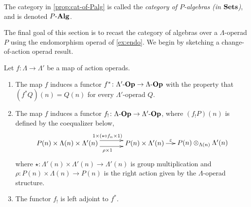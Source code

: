\begin{nota}\label{nota:cat-of-palg}
The category in \cref{prop:cat-of-Palg} is called the \emph{category of $P$-algebras (in $\mathbf{Sets}$)}, and is denoted $P\mbox{-}\mathbf{Alg}$.
\end{nota}

The final goal of this section is to recast the category of algebras over a $\Lambda$-operad $P$ using the endomorphism operad of \cref{ex:endo}.
We begin by sketching a change-of-action operad result.

\begin{prop}\label{prop:pbaop}
Let $f \colon \Lambda \rightarrow \Lambda'$ be a map of action operads. 
\begin{enumerate}
\item The map $f$ induces a functor $f^{*} \colon \Lambda'\mbox{-}\mathbf{Op} \rightarrow \Lambda\mbox{-}\mathbf{Op}$ with the property that $(f^{*}Q)(n) = Q(n)$ for every $\Lambda'$-operad $Q$.
\item The map $f$ induces a functor $f_{!} \colon \Lambda\mbox{-}\mathbf{Op} \rightarrow \Lambda'\mbox{-}\mathbf{Op}$, where $(f_{!}P)(n)$ is defined by the coequalizer below,
    \[
        \xy
            (-10,0)*+{P(n) \times \Lambda(n) \times \Lambda'(n)}="00";
            (30,0)*+{P(n) \times \Lambda'(n)}="10";
            (60,0)*+{\coeqb{P(n)}{\Lambda'(n)}{\Lambda(n)}}="20";
            {\ar@<1ex>^(.52){1 \times (\star \circ f_n \times 1)} "00" ; "10"};
            {\ar@<-1ex>_(.52){\rho \times 1} "00" ; "10"};
            {\ar^(.45){\varepsilon} "10" ; "20"};
        \endxy
    \]
where $\star \colon \Lambda'(n) \times \Lambda'(n) \to \Lambda'(n)$ is group multiplication and $\rho \colon P(n) \times \Lambda(n) \to P(n)$ is the right action given by the $\Lambda$-operad structure. 
\item The functor $f_{!}$ is left adjoint to $f^*$.
\end{enumerate}
\end{prop}
